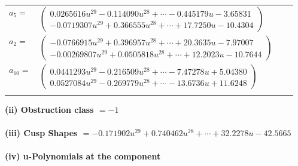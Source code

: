 \documentclass[1p]{elsarticle_modified}
\theoremstyle{definition}
\begin{document}
\begin{tabular}{m{7pt} m{180pt} m{7pt} m{180pt} }
\flushright $a_{5}=$&$\begin{pmatrix}0.0265616 u^{29}-0.114090 u^{28}+\cdots-0.445179 u-3.65831\\-0.0719307 u^{29}+0.366555 u^{28}+\cdots+17.7250 u-10.4304\end{pmatrix}$ \\
\flushright $a_{2}=$&$\begin{pmatrix}-0.0766915 u^{29}+0.396957 u^{28}+\cdots+20.3635 u-7.97007\\-0.00269807 u^{29}+0.0505818 u^{28}+\cdots+12.2023 u-10.7644\end{pmatrix}$ \\
\flushright $a_{10}=$&$\begin{pmatrix}0.0441293 u^{29}-0.216509 u^{28}+\cdots-7.47278 u+5.04380\\0.0527084 u^{29}-0.269779 u^{28}+\cdots-13.6736 u+11.6248\end{pmatrix}$\\&\end{tabular}
\flushleft \textbf{(ii) Obstruction class $= -1$}\\~\\
\flushleft \textbf{(iii) Cusp Shapes $= -0.171902 u^{29}+0.740462 u^{28}+\cdots+32.2278 u-42.5665$}\\~\\
\newpage\renewcommand{\arraystretch}{1}
\flushleft \textbf{(iv) u-Polynomials at the component}\newline \\
\end{document}
